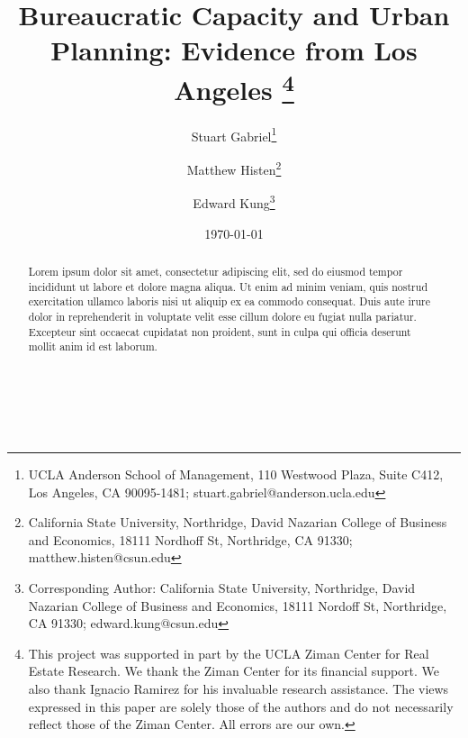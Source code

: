 \documentclass[12pt,english,hyperfootnotes=false,hidelinks]{article}
\title{
Bureaucratic Capacity and Urban Planning: Evidence from Los Angeles
\thanks{
This project was supported in part by the UCLA Ziman Center for Real Estate Research. We thank the Ziman Center for its financial support. We also thank Ignacio Ramirez for his invaluable research assistance. The views expressed in this paper are solely those of the authors and do not necessarily reflect those of the Ziman Center. All errors are our own.
}
}
\author{
    Stuart Gabriel\thanks{UCLA Anderson School of Management, 110 Westwood Plaza, Suite C412, Los Angeles, CA 90095-1481;  stuart.gabriel@anderson.ucla.edu} \and
    Matthew Histen\thanks{California State University, Northridge, David Nazarian College of Business and Economics, 18111 Nordhoff St, Northridge, CA 91330; matthew.histen@csun.edu} \and
    Edward Kung\thanks{Corresponding Author: California State University, Northridge, David Nazarian College of Business and Economics, 18111 Nordoff St, Northridge, CA 91330; edward.kung@csun.edu}
}
\date{\today}
\begin{document}
\maketitle

\singlespacing

\vspace{-1cm}

\begin{abstract}
Lorem ipsum dolor sit amet, consectetur adipiscing elit, sed do eiusmod tempor incididunt ut labore et dolore magna aliqua. Ut enim ad minim veniam, quis nostrud exercitation ullamco laboris nisi ut aliquip ex ea commodo consequat. Duis aute irure dolor in reprehenderit in voluptate velit esse cillum dolore eu fugiat nulla pariatur. Excepteur sint occaecat cupidatat non proident, sunt in culpa qui officia deserunt mollit anim id est laborum.
\end{abstract}


 \\
 \\


\doublespacing

\pagebreak








%
%


\pagebreak
\end{document}
